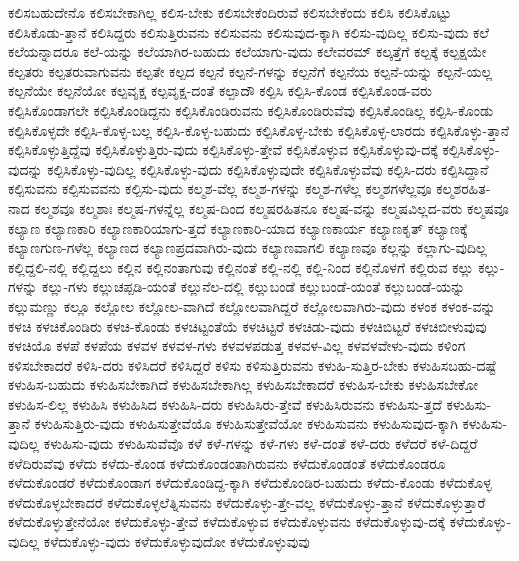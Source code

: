 {ಕಲಿಸಬಹುದೇನೊ
ಕಲಿಸಬೇಕಾಗಿಲ್ಲ
ಕಲಿಸ-ಬೇಕು
ಕಲಿಸಬೇಕೆಂದಿರುವೆ
ಕಲಿಸಬೇಕೆಂದು
ಕಲಿಸಿ
ಕಲಿಸಿಕೊಟ್ಟು
ಕಲಿಸಿಕೊಡು-ತ್ತಾನೆ
ಕಲಿಸಿದ್ದರು
ಕಲಿಸುತ್ತಿರುವನು
ಕಲಿಸುವನು
ಕಲಿಸುವುದ-ಕ್ಕಾಗಿ
ಕಲಿಸು-ವುದಿಲ್ಲ
ಕಲಿಸು-ವುದು
ಕಲೆ
ಕಲೆಯನ್ನಾದರೂ
ಕಲೆ-ಯನ್ನು
ಕಲೆಯಾಗಿರ-ಬಹುದು
ಕಲೆಯಾಗು-ವುದು
ಕಲೇವರಮ್
ಕಲ್ಕತ್ತೆಗೆ
ಕಲ್ಪಕ್ಕೆ
ಕಲ್ಪಕ್ಷಯೇ
ಕಲ್ಪತರು
ಕಲ್ಪತರುವಾಗುವನು
ಕಲ್ಪತೇ
ಕಲ್ಪದ
ಕಲ್ಪನೆ
ಕಲ್ಪನೆ-ಗಳನ್ನು
ಕಲ್ಪನೆಗೆ
ಕಲ್ಪನೆಯ
ಕಲ್ಪನೆ-ಯನ್ನು
ಕಲ್ಪನೆ-ಯಲ್ಲ
ಕಲ್ಪನೆಯೇ
ಕಲ್ಪನೆಯೋ
ಕಲ್ಪವೃಕ್ಷ
ಕಲ್ಪವೃಕ್ಷ-ದಂತೆ
ಕಲ್ಪಾದೌ
ಕಲ್ಪಿಸಿ
ಕಲ್ಪಿಸಿ-ಕೊಂಡ
ಕಲ್ಪಿಸಿಕೊಂಡ-ವರು
ಕಲ್ಪಿಸಿಕೊಂಡಾಗಲೇ
ಕಲ್ಪಿಸಿಕೊಂಡಿದ್ದನು
ಕಲ್ಪಿಸಿಕೊಂಡಿರುವನು
ಕಲ್ಪಿಸಿಕೊಂಡಿರುವೆವು
ಕಲ್ಪಿಸಿಕೊಂಡಿಲ್ಲ
ಕಲ್ಪಿಸಿ-ಕೊಂಡು
ಕಲ್ಪಿಸಿಕೊಳ್ಳದೇ
ಕಲ್ಪಿಸಿ-ಕೊಳ್ಳ-ಬಲ್ಲ
ಕಲ್ಪಿಸಿ-ಕೊಳ್ಳ-ಬಹುದು
ಕಲ್ಪಿಸಿಕೊಳ್ಳ-ಬೇಕು
ಕಲ್ಪಿಸಿಕೊಳ್ಳ-ಲಾರದು
ಕಲ್ಪಿಸಿಕೊಳ್ಳು-ತ್ತಾನೆ
ಕಲ್ಪಿಸಿಕೊಳ್ಳುತ್ತಿದ್ದೆವು
ಕಲ್ಪಿಸಿಕೊಳ್ಳುತ್ತಿರು-ವುದು
ಕಲ್ಪಿಸಿಕೊಳ್ಳು-ತ್ತೇವೆ
ಕಲ್ಪಿಸಿಕೊಳ್ಳುವ
ಕಲ್ಪಿಸಿಕೊಳ್ಳುವು-ದಕ್ಕೆ
ಕಲ್ಪಿಸಿಕೊಳ್ಳು-ವುದನ್ನು
ಕಲ್ಪಿಸಿಕೊಳ್ಳು-ವುದಿಲ್ಲ
ಕಲ್ಪಿಸಿಕೊಳ್ಳು-ವುದು
ಕಲ್ಪಿಸಿಕೊಳ್ಳುವುದೇ
ಕಲ್ಪಿಸಿಕೊಳ್ಳುವೆವು
ಕಲ್ಪಿಸಿ-ದರು
ಕಲ್ಪಿಸಿದ್ದಾನೆ
ಕಲ್ಪಿಸುವನು
ಕಲ್ಪಿಸುವವನು
ಕಲ್ಪಿಸು-ವುದು
ಕಲ್ಮಶ-ವೆಲ್ಲ
ಕಲ್ಮಶ-ಗಳನ್ನು
ಕಲ್ಮಶ-ಗಳೆಲ್ಲ
ಕಲ್ಮಶಗಳೆಲ್ಲವೂ
ಕಲ್ಮಶರಹಿತ-ನಾದ
ಕಲ್ಮಶವೂ
ಕಲ್ಮಶಾಃ
ಕಲ್ಮಷ-ಗಳನ್ನೆಲ್ಲ
ಕಲ್ಮಷ-ದಿಂದ
ಕಲ್ಮಷರಹಿತನೂ
ಕಲ್ಮಷ-ವನ್ನು
ಕಲ್ಮಷವಿಲ್ಲದ-ವರು
ಕಲ್ಮಷವೂ
ಕಲ್ಯಾಣ
ಕಲ್ಯಾಣಕಾರಿ
ಕಲ್ಯಾಣಕಾರಿಯಾಗು-ತ್ತದೆ
ಕಲ್ಯಾಣಕಾರಿ-ಯಾದ
ಕಲ್ಯಾಣಕಾರ್ಯ
ಕಲ್ಯಾಣಕೃತ್
ಕಲ್ಯಾಣಕ್ಕೆ
ಕಲ್ಯಾಣಗುಣ-ಗಳೆಲ್ಲ
ಕಲ್ಯಾಣದ
ಕಲ್ಯಾಣಪ್ರದವಾಗಿರು-ವುದು
ಕಲ್ಯಾಣವಾಗಲಿ
ಕಲ್ಯಾಣವೂ
ಕಲ್ಲನ್ನು
ಕಲ್ಲಾಗು-ವುದಿಲ್ಲ
ಕಲ್ಲಿದ್ದಲಿ-ನಲ್ಲಿ
ಕಲ್ಲಿದ್ದಲು
ಕಲ್ಲಿನ
ಕಲ್ಲಿನಂತಾಗುವು
ಕಲ್ಲಿನಂತೆ
ಕಲ್ಲಿ-ನಲ್ಲಿ
ಕಲ್ಲಿ-ನಿಂದ
ಕಲ್ಲಿನೊಳಗೆ
ಕಲ್ಲಿರುವ
ಕಲ್ಲು
ಕಲ್ಲು-ಗಳನ್ನು
ಕಲ್ಲು-ಗಳು
ಕಲ್ಲುಚಪ್ಪಡಿ-ಯಂತೆ
ಕಲ್ಲುನೆಲ-ದಲ್ಲಿ
ಕಲ್ಲುಬಂಡೆ
ಕಲ್ಲುಬಂಡೆ-ಯಂತೆ
ಕಲ್ಲುಬಂಡೆ-ಯನ್ನು
ಕಲ್ಲುಮಣ್ಣು
ಕಲ್ಲೂ
ಕಲ್ಲೋಲ
ಕಲ್ಲೋಲ-ವಾಗಿದೆ
ಕಲ್ಲೋಲವಾಗಿದ್ದರೆ
ಕಲ್ಲೋಲವಾಗಿರು-ವುದು
ಕಳಂಕ
ಕಳಂಕ-ವನ್ನು
ಕಳಚಿ
ಕಳಚಿಕೊಂಡಿರು
ಕಳಚಿ-ಕೊಂಡು
ಕಳಚಿಟ್ಟಂತೆಯೆ
ಕಳಚಿಟ್ಟರೆ
ಕಳಚಿಡು-ವುದು
ಕಳಚಿಬಿಟ್ಟರೆ
ಕಳಚಿಬೀಳುವುವು
ಕಳಚಿಯೊ
ಕಳಪೆ
ಕಳಪೆಯ
ಕಳವಳ
ಕಳವಳ-ಗಳು
ಕಳವಳಪಡುತ್ತ
ಕಳವಳ-ವಿಲ್ಲ
ಕಳವಳವೇಳು-ವುದು
ಕಳಿಂಗ
ಕಳಿಸಬೇಕಾದರೆ
ಕಳಿಸಿ-ದರು
ಕಳಿಸಿದರೆ
ಕಳಿಸಿದ್ದರೆ
ಕಳಿಸು
ಕಳಿಸುತ್ತಿರುವನು
ಕಳುಹಿ-ಸುತ್ತಿರ-ಬೇಕು
ಕಳುಹಿಸಬಹು-ದಷ್ಟೆ
ಕಳುಹಿಸ-ಬಹುದು
ಕಳುಹಿಸಬೇಕಾಗಿದೆ
ಕಳುಹಿಸಬೇಕಾಗಿಲ್ಲ
ಕಳುಹಿಸಬೇಕಾದರೆ
ಕಳುಹಿಸ-ಬೇಕು
ಕಳುಹಿಸಬೇಕೋ
ಕಳುಹಿಸ-ಲಿಲ್ಲ
ಕಳುಹಿಸಿ
ಕಳುಹಿಸಿದ
ಕಳುಹಿಸಿ-ದರು
ಕಳುಹಿಸಿರು-ತ್ತೇವೆ
ಕಳುಹಿಸಿರುವನು
ಕಳುಹಿಸು-ತ್ತದೆ
ಕಳುಹಿಸು-ತ್ತಾನೆ
ಕಳುಹಿಸುತ್ತಿರು-ವುದು
ಕಳುಹಿಸುತ್ತೇವೆಯೊ
ಕಳುಹಿಸುತ್ತೇವೆಯೋ
ಕಳುಹಿಸುವನು
ಕಳುಹಿಸುವುದ-ಕ್ಕಾಗಿ
ಕಳುಹಿಸು-ವುದಿಲ್ಲ
ಕಳುಹಿಸು-ವುದು
ಕಳುಹಿಸುವೆವೊ
ಕಳೆ
ಕಳೆ-ಗಳನ್ನು
ಕಳೆ-ಗಳು
ಕಳೆ-ದಂತೆ
ಕಳೆ-ದರು
ಕಳೆದರೆ
ಕಳೆ-ದಿದ್ದರೆ
ಕಳೆದಿರುವೆವು
ಕಳೆದು
ಕಳೆದು-ಕೊಂಡ
ಕಳೆದುಕೊಂಡಂತಾಗಿರುವನು
ಕಳೆದುಕೊಂಡಂತೆ
ಕಳೆದುಕೊಂಡರೂ
ಕಳೆದುಕೊಂಡರೆ
ಕಳೆದುಕೊಂಡಾಗ
ಕಳೆದುಕೊಂಡಿದ್ದ-ಕ್ಕಾಗಿ
ಕಳೆದುಕೊಂಡಿರ-ಬಹುದು
ಕಳೆದು-ಕೊಂಡು
ಕಳೆದುಕೊಳ್ಳ
ಕಳೆದುಕೊಳ್ಳಬೇಕಾದರೆ
ಕಳೆದುಕೊಳ್ಳಲೆತ್ನಿಸುವನು
ಕಳೆದುಕೊಳ್ಳು-ತ್ತೇ-ವಲ್ಲ
ಕಳೆದುಕೊಳ್ಳು-ತ್ತಾನೆ
ಕಳೆದುಕೊಳ್ಳುತ್ತಾರೆ
ಕಳೆದುಕೊಳ್ಳುತ್ತೇನೆಯೋ
ಕಳೆದುಕೊಳ್ಳು-ತ್ತೇವೆ
ಕಳೆದುಕೊಳ್ಳುವ
ಕಳೆದುಕೊಳ್ಳುವನು
ಕಳೆದುಕೊಳ್ಳುವು-ದಕ್ಕೆ
ಕಳೆದುಕೊಳ್ಳು-ವುದಿಲ್ಲ
ಕಳೆದುಕೊಳ್ಳು-ವುದು
ಕಳೆದುಕೊಳ್ಳುವುದೋ
ಕಳೆದುಕೊಳ್ಳುವುವು
}
